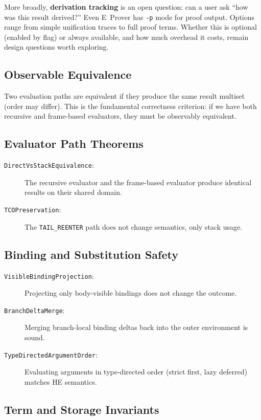 \documentclass[11pt]{article}
\newcommand{\code}[1]{\texttt{#1}}
\newcommand{\HE}{\textup{HE}}
\begin{document}
More broadly, \textbf{derivation tracking} is an open question: can a user
ask ``how was this result derived?''  Even E~Prover has \code{-p} mode for
proof output.  Options range from simple unification traces to full proof
terms.  Whether this is optional (enabled by flag) or always available,
and how much overhead it costs, remain design questions worth exploring.

\subsection{Observable Equivalence}

Two evaluation paths are equivalent if they produce the same result
multiset (order may differ).  This is the fundamental correctness
criterion: if we have both recursive and frame-based evaluators, they
must be observably equivalent.

\subsection{Evaluator Path Theorems}

\begin{description}
\item[\code{DirectVsStackEquivalence}:]
  The recursive evaluator and the frame-based evaluator produce
  identical results on their shared domain.
\item[\code{TCOPreservation}:]
  The \code{TAIL\_REENTER} path does not change semantics, only
  stack usage.
\end{description}

\subsection{Binding and Substitution Safety}

\begin{description}
\item[\code{VisibleBindingProjection}:]
  Projecting only body-visible bindings does not change the outcome.
\item[\code{BranchDeltaMerge}:]
  Merging branch-local binding deltas back into the outer environment
  is sound.
\item[\code{TypeDirectedArgumentOrder}:]
  Evaluating arguments in type-directed order (strict first, lazy
  deferred) matches \HE{} semantics.
\end{description}

\subsection{Term and Storage Invariants}
\end{document}

